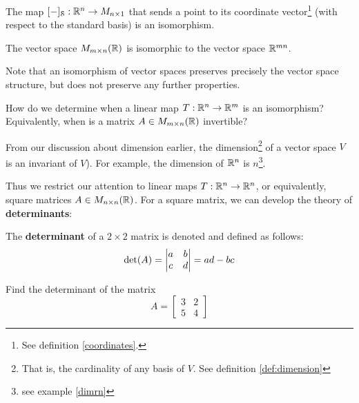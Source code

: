 \begin{example}
    The map $[-]_\mathcal{S} : \mathbb{R}^n \to M_{n \times 1}$ that sends a point to its coordinate vector\footnote{See definition \ref{coordinates}.} (with respect to the standard basis) is an isomorphism.
    \end{example}

\begin{example}
    The vector space $M_{m \times n}(\mathbb{R})$ is isomorphic to the vector space $\mathbb{R}^{mn}$.

    
    \end{example}

Note that an isomorphism of vector spaces preserves precisely the vector space structure, but does not preserve any further properties.






\begin{motivating}
How do we determine when a linear map $T : \mathbb{R}^n \to \mathbb{R}^m$ is an isomorphism?  Equivalently, when is a matrix $A \in M_{m \times n}(\mathbb{R})$ invertible?
\end{motivating}

From our discussion about dimension earlier, the dimension\footnote{That is, the cardinality of any basis of $V$.  See definition \ref{def:dimension}} of a vector space $V$ is an invariant of $V$).  For example, the dimension of $\mathbb{R}^n$ is $n$\footnote{see example \ref{dimrn}}.

Thus we restrict our attention to linear maps $T : \mathbb{R}^n \to \mathbb{R}^n$, or equivalently, square matrices $A \in M_{n \times n}(\mathbb{R})$.  For a square matrix, we can develop the theory of \textbf{determinants}:

\begin{definition}
    The \textbf{determinant} of a $2 \times 2$ matrix is denoted and defined as follows:
\begin{equation*}
\textnormal{det}(A) = 
\begin{vmatrix}
a & b \\
c & d
\end{vmatrix} = ad-bc
\end{equation*}

    \end{definition}

\begin{example}
    Find the determinant of the matrix \begin{equation*}
A = 
\begin{bmatrix}
3 & 2 \\
5 & 4
\end{bmatrix}
\end{equation*}
\end{example}

